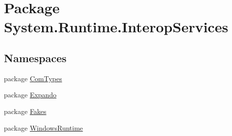 \hypertarget{namespace_system_1_1_runtime_1_1_interop_services}{\section{Package System.\-Runtime.\-Interop\-Services}
\label{namespace_system_1_1_runtime_1_1_interop_services}
}
\subsection*{Namespaces}
\begin{DoxyCompactItemize}
\item 
package \hyperlink{namespace_system_1_1_runtime_1_1_interop_services_1_1_com_types}{Com\-Types}
\item 
package \hyperlink{namespace_system_1_1_runtime_1_1_interop_services_1_1_expando}{Expando}
\item 
package \hyperlink{namespace_system_1_1_runtime_1_1_interop_services_1_1_fakes}{Fakes}
\item 
package \hyperlink{namespace_system_1_1_runtime_1_1_interop_services_1_1_windows_runtime}{Windows\-Runtime}
\end{DoxyCompactItemize}
